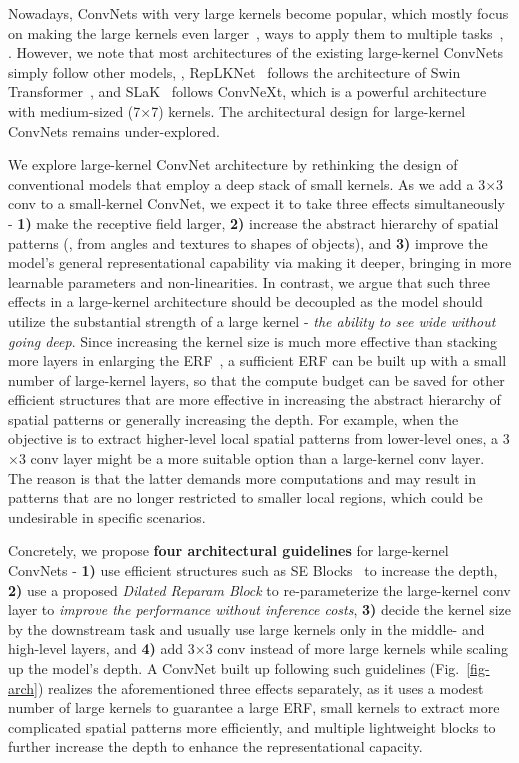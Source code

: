 \documentclass[10pt,twocolumn,letterpaper]{article}
\begin{document}
Nowadays, ConvNets with very large kernels become popular, which mostly focus on making the large kernels even larger~\cite{liu2022more}, ways to apply them to multiple tasks~\cite{chen2023largekernel3d,luo2023lkd,xie2023large}, \etc. However, we note that most architectures of the existing large-kernel ConvNets simply follow other models, \eg, RepLKNet~\cite{ding2022scaling} follows the architecture of Swin Transformer~\cite{liu2021swin}, and SLaK~\cite{liu2022more} follows ConvNeXt, which is a powerful architecture with medium-sized (7$\times$7) kernels. The architectural design for large-kernel ConvNets remains under-explored.

We explore large-kernel ConvNet architecture by rethinking the design of conventional models that employ a deep stack of small kernels. As we add a 3$\times$3 conv to a small-kernel ConvNet, we expect it to take three effects simultaneously - \textbf{1)} make the receptive field larger, \textbf{2)} increase the abstract hierarchy of spatial patterns (\eg, from angles and textures to shapes of objects), and \textbf{3)} improve the model's general representational capability via making it deeper, bringing in more learnable parameters and non-linearities. In contrast, we argue that such three effects in a large-kernel architecture should be decoupled as the model should utilize the substantial strength of a large kernel - \emph{the ability to see wide without going deep}. Since increasing the kernel size is much more effective than stacking more layers in enlarging the ERF~\cite{erf}, a sufficient ERF can be built up with a small number of large-kernel layers, so that the compute budget can be saved for other efficient structures that are more effective in increasing the abstract hierarchy of spatial patterns or generally increasing the depth. For example, when the objective is to extract higher-level local spatial patterns from lower-level ones, a 3$\times$3 conv layer might be a more suitable option than a large-kernel conv layer. The reason is that the latter demands more computations and may result in patterns that are no longer restricted to smaller local regions, which could be undesirable in specific scenarios. 



Concretely, we propose \textbf{four architectural guidelines} for large-kernel ConvNets - \textbf{1)} use efficient structures such as SE Blocks~\cite{hu2018squeeze} to increase the depth, \textbf{2)} use a proposed \emph{Dilated Reparam Block} to re-parameterize the large-kernel conv layer to \emph{improve the performance without inference costs}, \textbf{3)} decide the kernel size by the downstream task and usually use large kernels only in the middle- and high-level layers, and \textbf{4)} add 3$\times$3 conv instead of more large kernels while scaling up the model's depth. A ConvNet built up following such guidelines (Fig.~\ref{fig-arch}) realizes the aforementioned three effects separately, as it uses a modest number of large kernels to guarantee a large ERF, small kernels to extract more complicated spatial patterns more efficiently, and multiple lightweight blocks to further increase the depth to enhance the representational capacity.
\end{document}
